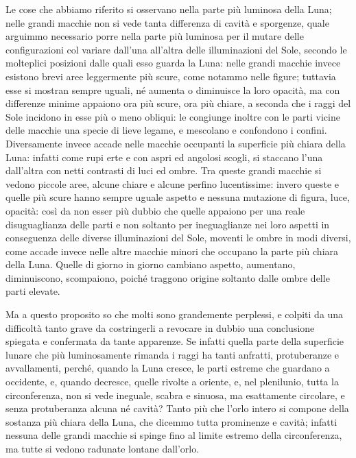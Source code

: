 \documentclass[11pt,twoside,openany]{book}
\begin{document}
Le cose che abbiamo riferito si osservano nella parte più luminosa della Luna; nelle grandi macchie non si vede tanta differenza di cavità e sporgenze, quale arguimmo necessario porre nella parte più luminosa per il mutare delle configurazioni col variare dall'una all'altra delle illuminazioni del Sole, secondo le molteplici posizioni dalle quali esso guarda la Luna: nelle grandi macchie invece esistono brevi aree leggermente più scure, come notammo nelle figure; tuttavia esse si mostran sempre uguali, né aumenta o diminuisce la loro opacità, ma con differenze minime appaiono ora più scure, ora più chiare, a seconda che i raggi del Sole incidono in esse più o meno obliqui: le congiunge inoltre con le parti vicine delle macchie una specie di lieve legame, e mescolano e confondono i confini. Diversamente invece accade nelle macchie occupanti la superficie più chiara della Luna: infatti come rupi erte e con aspri ed angolosi scogli, si staccano l'una dall'altra con netti contrasti di luci ed ombre. Tra queste grandi macchie si vedono piccole aree, alcune chiare e alcune perfino lucentissime: invero queste e quelle più scure hanno sempre uguale aspetto e nessuna mutazione di figura, luce, opacità: così da non esser più dubbio che quelle appaiono per una reale disuguaglianza delle parti e non soltanto per ineguaglianze nei loro aspetti in conseguenza delle diverse illuminazioni del Sole, moventi le ombre in modi diversi, come accade invece nelle altre macchie minori che occupano la parte più chiara della Luna. Quelle di giorno in giorno cambiano aspetto, aumentano, diminuiscono, scompaiono, poiché traggono origine soltanto dalle ombre delle parti elevate.

Ma a questo proposito so che molti sono grandemente perplessi, e colpiti da una difficoltà tanto grave da costringerli a revocare in dubbio una conclusione spiegata e confermata da tante apparenze. Se infatti quella parte della superficie lunare che più luminosamente rimanda i raggi ha tanti anfratti, protuberanze e avvallamenti, perché, quando la Luna cresce, le parti estreme che guardano a occidente, e, quando decresce, quelle rivolte a oriente, e, nel plenilunio, tutta la circonferenza, non si vede ineguale, scabra e sinuosa, ma esattamente circolare, e senza protuberanza alcuna né cavità? Tanto più che l'orlo intero si compone della sostanza più chiara della Luna, che dicemmo tutta prominenze e cavità; infatti nessuna delle grandi macchie si spinge fino al limite estremo della circonferenza, ma tutte si vedono radunate lontane dall'orlo.
\end{document}
